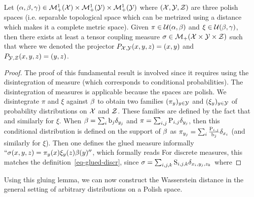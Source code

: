 \begin{lem}\label{lem-gluing-general}
	Let $(\alpha,\beta,\gamma) \in \mathcal{M}_+^1(\mathcal{X}) \times \mathcal{M}_+^1(\mathcal{Y}) \times \mathcal{M}_+^1(\mathcal{Y})$
	where $(\mathcal{X},\mathcal{Y},\mathcal{Z})$ are three polish spaces (i.e. separable topological space which can be metrized using a distance which makes it a complete metric space).  
	Given $\pi \in \mathcal{U}(\alpha,\beta)$ and $\xi \in \mathcal{U}(\beta,\gamma)$, then there exists at least a tensor coupling measure
	$\sigma \in \mathcal{M}_+(\mathcal{X} \times \mathcal{Y} \times \mathcal{Z})$ such that 
	where we denoted the projector $P_{\mathcal{X},\mathcal{Y}}(x,y,z)=(x,y)$ and $P_{\mathcal{Y},\mathcal{Z}}(x,y,z)=(y,z)$. 
\end{lem}
\begin{proof}
	The proof of this fundamental result is involved since it requires using the disintegration of measure (which corresponds to conditional probabilities). 
	The disintegration of measures is applicable because the spaces are polish. 
	We disintegrate $\pi$ and $\xi$ against $\beta$ to obtain two families $(\pi_y)_{y \in \mathcal{Y}}$ and $(\xi_y)_{y \in \mathcal{Y}}$ of probability distributions on $\mathcal{X}$ and $\mathcal{Z}$. These families are defined by the fact that 
	and similarly for $\xi$.
	When $\beta=\sum_i \mathrm{b}_j \delta_{y_j}$ and $\pi=\sum_{i,j} \mathrm{P}_{i,j} \delta_{y_j}$, then this conditional distribution is defined on the support of $\beta$ as
	$\pi_{y_j} = \sum_i \frac{\mathrm{P}_{i,j}}{\mathrm{b}_j} \delta_{x_i}$ (and similarly for $\xi$).
	Then one defines the glued measure informally $``\sigma(x,y,z) = \pi_y(x) \xi_y(z) \beta(y)''$, which formally reads
	For discrete measures, this matches the definition~\eqref{eq-glued-discr}, since $\sigma=\sum_{i,j,k} \mathrm{S}_{i,j,k} \delta_{x_i,y_j,z_k}$ where
\end{proof}

Using this gluing lemma, we can now construct the Wasserstein distance in the general setting of arbitrary distributions on a Polish space.

